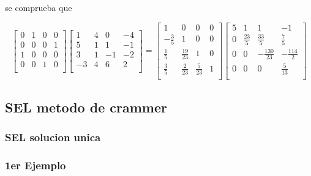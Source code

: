 \documentclass{article}
\begin{document}
se comprueba que

\[
\begin{bmatrix}
    0 & 1 & 0 & 0 \\
    0 & 0 & 0 & 1 \\
    1 & 0 & 0 & 0 \\
    0 & 0 & 1 & 0 \\
    \end{bmatrix}
\begin{bmatrix}
    1 & 4 & 0 & -4 \\
    5 & 1 & 1 & -1 \\
    3 & 1 & -1 & -2 \\
    -3 & 4 & 6 & 2 \\
    \end{bmatrix}
=
    \begin{bmatrix}
        1 & 0 & 0 & 0 \\
        -\frac{3}{5} & 1 & 0 & 0 \\
        \frac{1}{5} & \frac{19}{23} & 1 & 0 \\
        \frac{3}{5} & \frac{2}{23} & \frac{5}{23} & 1 \\
        \end{bmatrix}
    \begin{bmatrix}
        5 & 1 & 1 & -1 \\
        0 & \frac{23}{5} & \frac{33}{5} & \frac{7}{5} \\
        0 & 0 & -\frac{130}{23} & -\frac{114}{2} \\
        0 & 0 & 0 & \frac{5}{13} \\
        \end{bmatrix}
\]







\subsection{SEL metodo de crammer}



\subsubsection{SEL solucion unica}

\subsubsection{1er Ejemplo}
\end{document}
